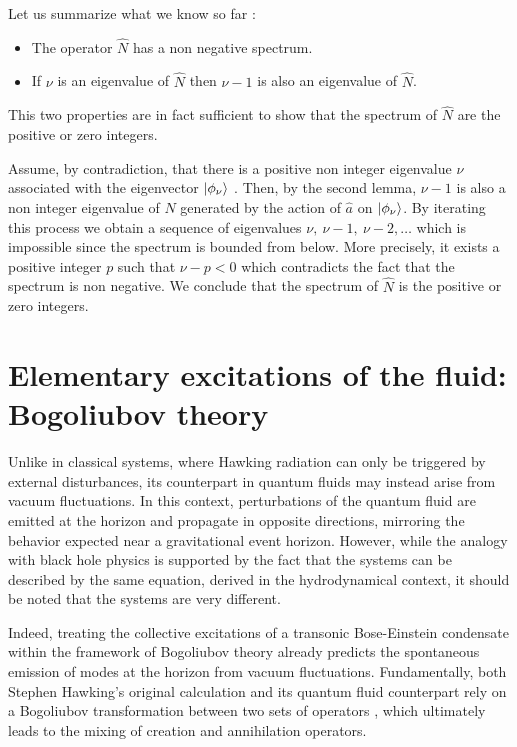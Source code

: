\noindent Let us summarize what we know so far :
\begin{itemize}
    \item The operator $\hat{N}$ has a non negative spectrum. 
    \item If $\nu$ is an eigenvalue of $\hat{N}$ then $\nu-1$ is also an eigenvalue of $\hat{N}$.
\end{itemize}

This two properties are in fact sufficient to show that the spectrum of $\hat{N}$ are the positive or zero integers. \\
\bigskip 

Assume, by contradiction, that there is a positive non integer eigenvalue $\nu$ associated with the eigenvector $\ket{\phi_\nu}$ . Then, by the second lemma, $\nu-1$ is also a non integer eigenvalue of $\hat{N}$ generated by 
the action of $\hat{a}$ on $\ket{\phi_\nu}$. By iterating this process we obtain a sequence of eigenvalues $\nu,\ \nu-1,\ \nu-2,\dots$ which is impossible since the spectrum is bounded from below. More precisely, it exists
a positive integer $p$ such that $\nu-p<0$ which contradicts the fact that the spectrum is non negative. We conclude that the spectrum of $\hat{N}$ is the positive or zero integers.




\section{Elementary excitations of the fluid: Bogoliubov theory}
Unlike in classical systems, where Hawking radiation can only be triggered by external disturbances, its counterpart in quantum fluids may instead arise from vacuum fluctuations. In this context, perturbations of the quantum fluid are emitted at the horizon and propagate in opposite directions, mirroring the behavior expected near a gravitational event horizon. 
However, while the analogy with black hole physics is supported by the fact that the systems can be described by the same equation, derived in the  hydrodynamical context, it should be noted that the systems are very different.

Indeed, treating the collective excitations of a transonic Bose-Einstein condensate within the framework of Bogoliubov theory already predicts the spontaneous emission of modes at the horizon from vacuum fluctuations. Fundamentally, both Stephen Hawking's original calculation and its quantum fluid counterpart rely on a Bogoliubov transformation between two sets of operators \cite{hawking_black_1972}, which ultimately leads to the mixing of creation and annihilation operators.


